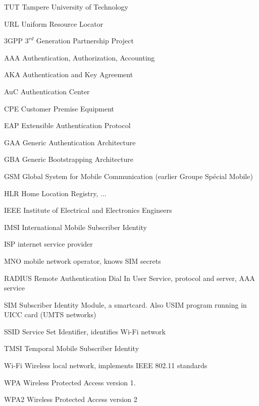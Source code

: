 \documentclass[12pt,a4paper,english]{tutthesis}
\begin{document}
\begin{otherlanguage}{english}
\begin{termlist}
\item [TUT]    Tampere University of Technology
\item [URL]    Uniform Resource Locator
\item[3GPP] $3^{rd}$ Generation Partnership Project
\item[AAA] Authentication, Authorization, Accounting
\item[AKA] Authentication and Key Agreement %
\item[AuC] Authentication Center
\item[CPE] Customer Premise Equipment %
\item[EAP] Extensible Authentication Protocol %
\item[GAA] Generic Authentication Architecture %
\item[GBA] Generic Bootstrapping Architecture
\item[GSM] Global System for Mobile Communication (earlier Groupe Spécial Mobile)
\item[HLR] Home Location Registry, ...
\item[IEEE] Institute of Electrical and Electronics Engineers
\item[IMSI] International Mobile Subscriber Identity
\item[ISP] internet service provider
\item[MNO] mobile network operator, knows SIM secrets
\item[RADIUS] Remote Authentication Dial In User Service, protocol and server,  AAA service 
\item[SIM]  Subscriber Identity Module, a smartcard. Also USIM program running in UICC card (UMTS networks)
\item[SSID] Service Set Identifier, identifies Wi-Fi network
\item[TMSI] Temporal Mobile Subscriber Identity
\item[Wi-Fi] Wireless local network, implements IEEE 802.11 standards
\item[WPA] Wireless Protected Access version 1.
\item[WPA2] Wireless Protected Access version 2
\end{termlist} 



\end{otherlanguage}
\end{document}

